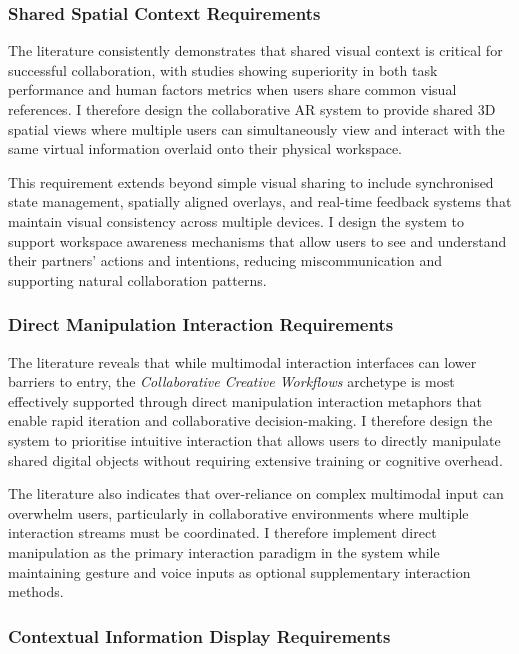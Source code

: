 \subsubsection{Shared Spatial Context Requirements}

The literature consistently demonstrates that shared visual context is critical for successful collaboration, with studies showing superiority in both task performance and human factors metrics when users share common visual references. I therefore design the collaborative AR system to provide shared 3D spatial views where multiple users can simultaneously view and interact with the same virtual information overlaid onto their physical workspace.

This requirement extends beyond simple visual sharing to include synchronised state management, spatially aligned overlays, and real-time feedback systems that maintain visual consistency across multiple devices. I design the system to support workspace awareness mechanisms that allow users to see and understand their partners' actions and intentions, reducing miscommunication and supporting natural collaboration patterns.

\subsubsection{Direct Manipulation Interaction Requirements}

The literature reveals that while multimodal interaction interfaces can lower barriers to entry, the \emph{Collaborative Creative Workflows} archetype is most effectively supported through direct manipulation interaction metaphors that enable rapid iteration and collaborative decision-making. I therefore design the system to prioritise intuitive interaction that allows users to directly manipulate shared digital objects without requiring extensive training or cognitive overhead.

The literature also indicates that over-reliance on complex multimodal input can overwhelm users, particularly in collaborative environments where multiple interaction streams must be coordinated. I therefore implement direct manipulation as the primary interaction paradigm in the system while maintaining gesture and voice inputs as optional supplementary interaction methods.

\subsubsection{Contextual Information Display Requirements}

